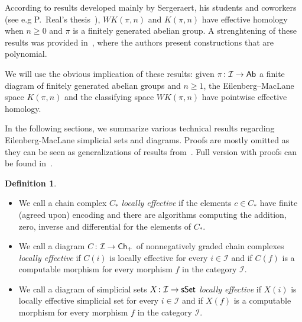 \documentclass[12pt,a4wide]{article}
\theoremstyle{plain}
\theoremstyle{definition}
\newtheorem{Def}[thm]{Definition}
\newcommand{\Engen}{WK(\pi,\then)}
\newcommand{\Kpin}{K(\pi,\then)}
\newcommand{\then}{n}
\newcommand{\thedim}{{n}}
\newcommand{\thedimm}{{k}}
\renewcommand\:{\colon}
\newcommand{\dX}{X}
\newcommand{\dpi}{\pi}
\newcommand{\dK}{K}
\newcommand{\dC}{{C}}
\newcommand{\icat}{\mathcal I}
\begin{document}

According to results developed mainly by  Sergeraert, his students and coworkers (see e.g P.~Real's thesis~\cite{real2}),  $\Engen$ and $\Kpin$ have effective homology when $\thedim\geq 0$ and $\pi$ is a finitely generated abelian group. A strenghtening of these results was provided in~\cite{polypost}, where the authors present constructions that are polynomial. 

We will use the obvious implication of these results: given $\dpi \: \icat \to \Ab$ a finite diagram of finitely generated abelian groups and $\thedim \geq 1$, the Eilenberg--MacLane space $\dK(\dpi,\thedim)$ and the classifying space $\Engen$ have pointwise effective homology.


In the following sections, we summarize various technical results regarding Eilenberg-MacLane simplicial sets and diagrams. Proofs are mostly omitted as they can be seen as generalizations of results from~\cite{polypost}. Full version with proofs can be found in~\cite{filak-thesis}.


\begin{Def}\label{def:pointw-effective}
\begin{itemize}
\item We call a chain complex $C_*$ \emph{locally effective} if the elements $c\in C_*$ have finite (agreed upon) encoding and there are algorithms computing the addition, zero, inverse and differential for the elements of $C_*$. 

\item We call a diagram $\dC \colon\icat \to \Ch_+$ of nonnegatively graded chain complexes \emph{locally effective} if $\dC (i)$ is locally effective for every $i \in \icat$ and if $\dC(f)$ is a computable morphism for every morphism $f$ in the category $\icat$.

\item We call a diagram of simplicial sets $\dX \: \icat \to \sSet$ \emph{locally effective} if $\dX (i)$ is locally effective simplicial set for every $i \in \icat$ and if $\dX(f)$ is a computable morphism for every morphism $f$ in the category $\icat$.
\end{itemize}
\end{Def}
\end{document}
